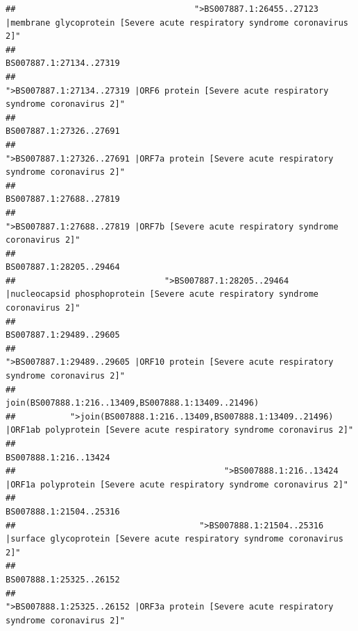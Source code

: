 \documentclass[
]{article}
\begin{document}
\begin{verbatim}
##                                    ">BS007887.1:26455..27123 |membrane glycoprotein [Severe acute respiratory syndrome coronavirus 2]" 
##                                                                                                                BS007887.1:27134..27319 
##                                             ">BS007887.1:27134..27319 |ORF6 protein [Severe acute respiratory syndrome coronavirus 2]" 
##                                                                                                                BS007887.1:27326..27691 
##                                            ">BS007887.1:27326..27691 |ORF7a protein [Severe acute respiratory syndrome coronavirus 2]" 
##                                                                                                                BS007887.1:27688..27819 
##                                                    ">BS007887.1:27688..27819 |ORF7b [Severe acute respiratory syndrome coronavirus 2]" 
##                                                                                                                BS007887.1:28205..29464 
##                              ">BS007887.1:28205..29464 |nucleocapsid phosphoprotein [Severe acute respiratory syndrome coronavirus 2]" 
##                                                                                                                BS007887.1:29489..29605 
##                                            ">BS007887.1:29489..29605 |ORF10 protein [Severe acute respiratory syndrome coronavirus 2]" 
##                                                                                    join(BS007888.1:216..13409,BS007888.1:13409..21496) 
##           ">join(BS007888.1:216..13409,BS007888.1:13409..21496) |ORF1ab polyprotein [Severe acute respiratory syndrome coronavirus 2]" 
##                                                                                                                  BS007888.1:216..13424 
##                                          ">BS007888.1:216..13424 |ORF1a polyprotein [Severe acute respiratory syndrome coronavirus 2]" 
##                                                                                                                BS007888.1:21504..25316 
##                                     ">BS007888.1:21504..25316 |surface glycoprotein [Severe acute respiratory syndrome coronavirus 2]" 
##                                                                                                                BS007888.1:25325..26152 
##                                            ">BS007888.1:25325..26152 |ORF3a protein [Severe acute respiratory syndrome coronavirus 2]" 

\end{verbatim}
\end{document}

